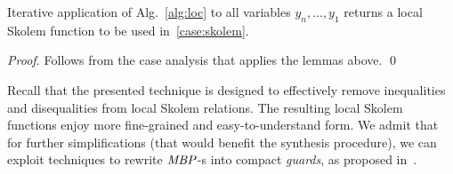 \begin{theorem}[Soundness]
Iterative application of Alg.~\ref{alg:loc} to all variables $y_n,\ldots,y_1$ returns a local Skolem function to be used in~\eqref{case:skolem}.
\end{theorem}
\begin{proof}
Follows from the case analysis that applies the lemmas above.
\qed
\end{proof}

Recall that the presented technique is designed to effectively remove inequalities and disequalities from local Skolem relations.
The resulting local Skolem functions enjoy more fine-grained and easy-to-understand form.
We admit that for further simplifications (that would benefit the synthesis procedure), we can exploit techniques to rewrite $\mathit{MBP}$-s into compact \emph{guards}, as proposed in~\cite{fedyukovich2015automated}.


